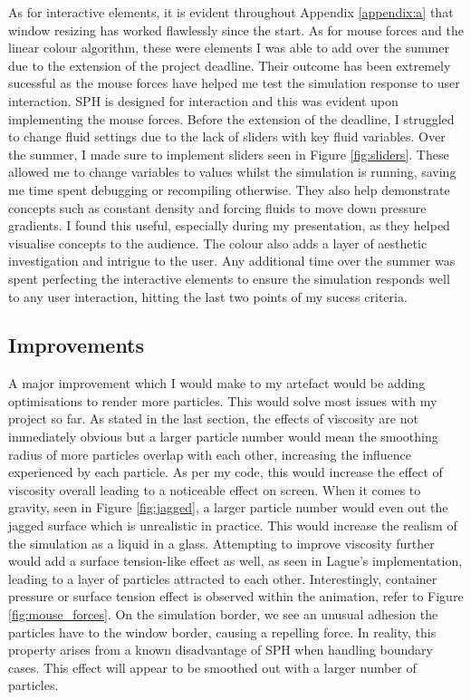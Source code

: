 \documentclass[write-up.tex]{subfiles}
\begin{document}
As for interactive elements, it is evident throughout Appendix \ref{appendix:a} that window resizing has worked flawlessly since the start. As for mouse forces and the linear colour algorithm, these were elements I was able to add over the summer due to the extension of the project deadline. Their outcome has been extremely sucessful as the mouse forces have helped me test the simulation response to user interaction. SPH is designed for interaction and this was evident upon implementing the mouse forces. Before the extension of the deadline, I struggled to change fluid settings due to the lack of sliders with key fluid variables. Over the summer, I made sure to implement sliders seen in Figure \ref{fig:sliders}. These allowed me to change variables to values whilst the simulation is running, saving me time spent debugging or recompiling otherwise. They also help demonstrate concepts such as constant density and forcing fluids to move down pressure gradients. I found this useful, especially during my presentation, as they helped visualise concepts to the audience. The colour also adds a layer of aesthetic investigation and intrigue to the user. Any additional time over the summer was spent perfecting the interactive elements to ensure the simulation responds well to any user interaction, hitting the last two points of my sucess criteria.
\subsection{Improvements}
A major improvement which I would make to my artefact would be adding optimisations to render more particles. This would solve most issues with my project so far. As stated in the last section, the effects of viscosity are not immediately obvious but a larger particle number would mean the smoothing radius of more particles overlap with each other, increasing the influence experienced by each particle. As per my code, this would increase the effect of viscosity overall leading to a noticeable effect on screen. When it comes to gravity, seen in Figure \ref{fig:jagged}, a larger particle number would even out the jagged surface which is unrealistic in practice. This would increase the realism of the simulation as a liquid in a glass. Attempting to improve viscosity further would add a surface tension-like effect as well, as seen in Lague's \cite{Lague} implementation, leading to a layer of particles attracted to each other. Interestingly, container pressure or surface tension effect is observed within the animation, refer to Figure \ref{fig:mouse_forces}. On the simulation border, we see an unusual adhesion the particles have to the window border, causing a repelling force. In reality, this property arises from a known disadvantage of SPH when handling boundary cases. This effect will appear to be smoothed out with a larger number of particles.
\end{document}

